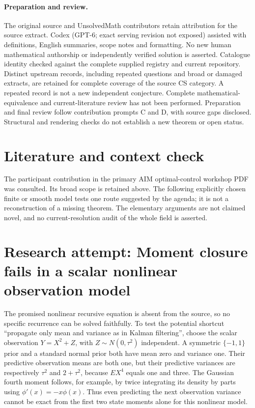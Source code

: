 \documentclass[11pt]{article}
\begin{document}
\paragraph{Preparation and review.}
The original source and UnsolvedMath contributors retain attribution for the source extract. Codex (GPT-6; exact serving revision not exposed) assisted with definitions, English summaries, scope notes and formatting. No new human mathematical authorship or independently verified solution is asserted. Catalogue identity checked against the complete supplied registry and current repository. Distinct upstream records, including repeated questions and broad or damaged extracts, are retained for complete coverage of the source CS category. A repeated record is not a new independent conjecture. Complete mathematical-equivalence and current-literature review has not been performed. Preparation and final review follow contribution prompts C and D, with source gaps disclosed. Structural and rendering checks do not establish a new theorem or open status.
\label{end:statement}

\section{Literature and context check}
The participant contribution in the primary AIM optimal-control workshop
 PDF was consulted. Its broad scope is retained above. The following explicitly
 chosen finite or smooth model tests one route suggested by the agenda; it is
 not a reconstruction of a missing theorem. The elementary arguments are not
 claimed novel, and no current-resolution audit of the whole field is asserted.
\section{Research attempt: Moment closure fails in a scalar nonlinear observation model}
The promised nonlinear recursive equation is absent from the source, so no
specific recurrence can be solved faithfully. To test the potential shortcut
``propagate only mean and variance as in Kalman filtering'', choose the scalar
observation $Y=X^2+Z$, with $Z\sim N(0,\tau^2)$ independent.
A symmetric $\{ -1,1\}$ prior and a standard normal prior both have mean zero
and variance one. Their predictive observation means are both one, but their
predictive variances are respectively $\tau^2$ and $2+\tau^2$, because
$E X^4$ equals one and three. The Gaussian fourth moment follows, for example,
by twice integrating its density by parts using $\phi'(x)=-x\phi(x)$.
Thus even predicting the next observation variance cannot be exact from the
first two state moments alone for this nonlinear model.
\end{document}
